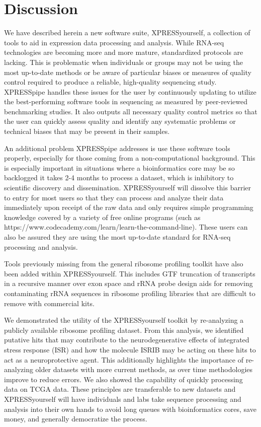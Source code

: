 \documentclass[11pt, a4paper, oneside]{article}
\begin{document}
\section{Discussion}
We have described herein a new software suite, XPRESSyourself, a collection of tools to aid in expression data processing and analysis. While RNA-seq technologies are becoming more and more mature, standardized protocols are lacking. This is problematic when individuals or groups may not be using the most up-to-date methods or be aware of particular biases or measures of quality control required to produce a reliable, high-quality sequencing study. XPRESSpipe handles these issues for the user by continuously updating to utilize the best-performing software tools in sequencing as measured by peer-reviewed benchmarking studies. It also outputs all necessary quality control metrics so that the user can quickly assess quality and identify any systematic problems or technical biases that may be present in their samples. \par

An additional problem XPRESSpipe addresses is use these software tools properly, especially for those coming from a non-computational background. This is especially important in situations where a bioinformatics core may be so backlogged it takes 2-4 months to process a dataset, which is inhibitory to scientific discovery and dissemination. XPRESSyourself will dissolve this barrier to entry for most users so that they can process and analyze their data immediately upon receipt of the raw data and only requires simple programming knowledge covered by a variety of free online programs (such as https://www.codecademy.com/learn/learn-the-command-line). These users can also be assured they are using the most up-to-date standard for RNA-seq processing and analysis. \par

Tools previously missing from the general ribosome profiling toolkit have also been added within XPRESSyourself. This includes GTF truncation of transcripts in a recursive manner over exon space and rRNA probe design aids for removing contaminating rRNA sequences in ribosome profiling libraries that are difficult to remove with commercial kits. \par

We demonstrated the utility of the XPRESSyourself toolkit by re-analyzing a publicly available ribosome profiling dataset. From this analysis, we identified putative hits that may contribute to the neurodegenerative effects of integrated stress response (ISR) and how the molecule ISRIB may be acting on these hits to act as a neuroprotective agent. This additionally highlights the importance of re-analyzing older datasets with more current methods, as over time methodologies improve to reduce errors. We also showed the capability of quickly processing data on TCGA data. These principles are transferable to new datasets and XPRESSyourself will have individuals and labs take sequence processing and analysis into their own hands to avoid long queues with bioinformatics cores, save money, and generally democratize the process. \par
\end{document}
